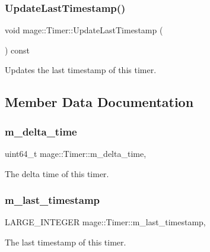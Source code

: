 \subsubsection{\texorpdfstring{Update\+Last\+Timestamp()}{UpdateLastTimestamp()}}
{\footnotesize\ttfamily void mage\+::\+Timer\+::\+Update\+Last\+Timestamp (\begin{DoxyParamCaption}{ }\end{DoxyParamCaption}) const\hspace{0.3cm}{\ttfamily [private]}}

Updates the last timestamp of this timer. 

\subsection{Member Data Documentation}
\hypertarget{classmage_1_1_timer_abc87d3df1af91f1c8cfb1ad7728e8b55}{}\label{classmage_1_1_timer_abc87d3df1af91f1c8cfb1ad7728e8b55} 
\subsubsection{\texorpdfstring{m\+\_\+delta\+\_\+time}{m\_delta\_time}}
{\footnotesize\ttfamily uint64\+\_\+t mage\+::\+Timer\+::m\+\_\+delta\+\_\+time\hspace{0.3cm}{\ttfamily [mutable]}, {\ttfamily [private]}}

The delta time of this timer. \hypertarget{classmage_1_1_timer_a6effbc37827492397cc781a78165a08a}{}\label{classmage_1_1_timer_a6effbc37827492397cc781a78165a08a} 
\subsubsection{\texorpdfstring{m\+\_\+last\+\_\+timestamp}{m\_last\_timestamp}}
{\footnotesize\ttfamily L\+A\+R\+G\+E\+\_\+\+I\+N\+T\+E\+G\+ER mage\+::\+Timer\+::m\+\_\+last\+\_\+timestamp\hspace{0.3cm}{\ttfamily [mutable]}, {\ttfamily [private]}}

The last timestamp of this timer. \hypertarget{classmage_1_1_timer_ac8d975843e5b2199848284de910d3291}{}\label{classmage_1_1_timer_ac8d975843e5b2199848284de910d3291} 
